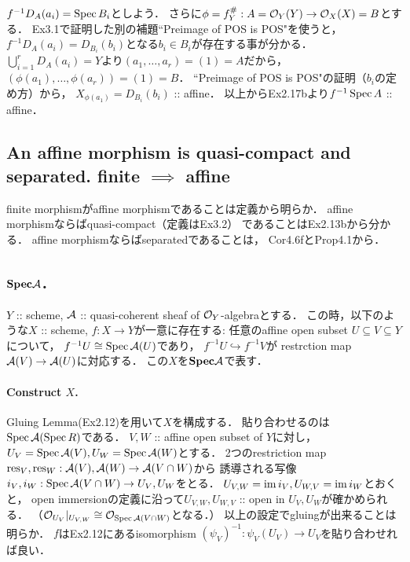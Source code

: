 \documentclass[a4paper]{jsarticle}
\newcommand{\bfSpec}{\mathbf{Spec}}
\begin{document}
    $f^{-1} D_A(a_i)=\operatorname{Spec} B_i$としよう．
    さらに$\phi=f^{\#}_Y: A=\mathcal{O}_Y(Y) \to \mathcal{O}_X(X)=B$とする．
    Ex3.1で証明した別の補題``Preimage of POS is POS"を使うと，
    $f^{-1} D_A(a_i)=D_{B_i}(b_i)$となる$b_i \in B_i$が存在する事が分かる．
    $\bigcup_{i=1}^r D_A(a_i)=Y$より$(a_1,\dots,a_r)=(1)=A$だから，
    $(\phi(a_1), \dots,\phi(a_r))=(1)=B$．
    ``Preimage of POS is POS"の証明（$b_i$の定め方）から，
    $X_{\phi(a_1)}=D_{B_i}(b_i)$ :: affine．
    以上からEx2.17bより$f^{-1}\operatorname{Spec} A$ :: affine．

    \subsection{An affine morphism is quasi-compact and separated. finite $\implies$ affine}
    finite morphismがaffine morphismであることは定義から明らか．
    affine morphismならばquasi-compact（定義はEx3.2）
    であることはEx2.13bから分かる．
    affine morphismならばseparatedであることは，
    Cor4.6fとProp4.1から．
    
    \subsection{$\bfSpec \shA$.}
    $Y$ :: scheme, $\mathcal{A}$ :: quasi-coherent sheaf of $\mathcal{O}_Y$-algebraとする．
    この時，以下のような$X$ :: scheme, $f : X \to Y$が一意に存在する:
    任意のaffine open subset $U \subseteq V \subseteq Y$について，
    $f^{-1}U \cong \operatorname{Spec} \mathcal{A}(U)$であり，
    $f^{-1}U \hookrightarrow f^{-1}V$が
    restrction map $\mathcal{A}(V) \to \mathcal{A}(U)$に対応する．
    この$X$を$\bfSpec \shA$で表す．

    \paragraph{Construct $X$.}
    Gluing Lemma(Ex2.12)を用いて$X$を構成する．
    貼り合わせるのは$\operatorname{Spec} \mathcal{A}(\operatorname{Spec} R)$である．
    $V, W$ :: affine open subset of $Y$に対し，
    $U_{V}=\operatorname{Spec} \mathcal{A}(V), U_{W}=\operatorname{Spec} \mathcal{A}(W)$とする．
    2つのrestriction map $\operatorname{res}_V, \operatorname{res}_W: \mathcal{A}(V), \mathcal{A}(W) \to \mathcal{A}(V \cap W)$から
    誘導される写像$i_V, i_W: \operatorname{Spec} \mathcal{A}(V \cap W) \to U_V, U_W$をとる．
    $U_{V,W}=\operatorname{im} i_V, U_{W,V}=\operatorname{im} i_W$とおくと，
    open immersionの定義に沿って$U_{V,W}, U_{W,V}$ :: open in $U_V, U_W$が確かめられる．
    （$\mathcal{O}_{U_V}|_{U_{V,W}} \cong \mathcal{O}_{\operatorname{Spec} \mathcal{A}(V \cap W)}$となる．）
    以上の設定でgluingが出来ることは明らか．
    $f$はEx2.12にあるisomorphism $(\psi_V)^{-1}: \psi_V(U_V) \to U_V$を貼り合わせれば良い．
\end{document}
